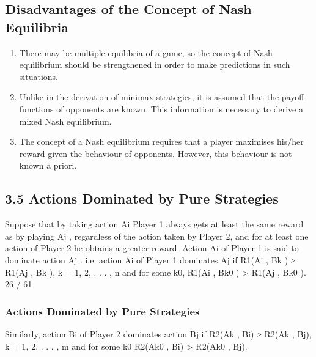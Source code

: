 \documentclass[]{report}
\begin{document}
\subsection{Disadvantages of the Concept of Nash Equilibria}
\begin{enumerate}
	\item There may be multiple equilibria of a game, so the
	concept of Nash equilibrium should be strengthened
	in order to make predictions in such situations.
	\item Unlike in the derivation of minimax strategies, it is
	assumed that the payoff functions of opponents are
	known. This information is necessary to derive a
	mixed Nash equilibrium.
	\item  The concept of a Nash equilibrium requires that a
	player maximises his/her reward given the behaviour
	of opponents. However, this behaviour is not known
	a priori.
\end{enumerate}

\subsection{3.5 Actions Dominated by Pure Strategies}
Suppose that by taking action Ai Player 1 always gets at least the
same reward as by playing Aj
, regardless of the action taken by
Player 2, and for at least one action of Player 2 he obtains a
greater reward. Action Ai of Player 1 is said to dominate action Aj
.
i.e. action Ai of Player 1 dominates Aj
if
R1(Ai
, Bk ) ≥ R1(Aj
, Bk ), k = 1, 2, . . . , n
and for some k0, R1(Ai
, Bk0
) > R1(Aj
, Bk0
).
26 / 61
\subsubsection{Actions Dominated by Pure Strategies}
Similarly, action Bi of Player 2 dominates action Bj
if
R2(Ak , Bi) ≥ R2(Ak , Bj), k = 1, 2, . . . , m
and for some k0
R2(Ak0
, Bi) > R2(Ak0
, Bj).
\end{document}
